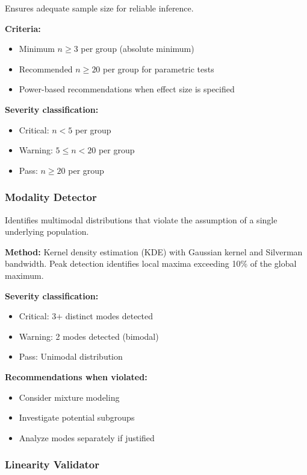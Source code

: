 \documentclass[article]{jss}
\begin{document}
Ensures adequate sample size for reliable inference.

\textbf{Criteria:}
\begin{itemize}
\item Minimum $n \geq 3$ per group (absolute minimum)
\item Recommended $n \geq 20$ per group for parametric tests
\item Power-based recommendations when effect size is specified
\end{itemize}

\textbf{Severity classification:}
\begin{itemize}
\item Critical: $n < 5$ per group
\item Warning: $5 \leq n < 20$ per group
\item Pass: $n \geq 20$ per group
\end{itemize}

\subsubsection{Modality Detector}

Identifies multimodal distributions that violate the assumption of a single underlying population.

\textbf{Method:} Kernel density estimation (KDE) with Gaussian kernel and Silverman bandwidth. Peak detection identifies local maxima exceeding 10\% of the global maximum.

\textbf{Severity classification:}
\begin{itemize}
\item Critical: 3+ distinct modes detected
\item Warning: 2 modes detected (bimodal)
\item Pass: Unimodal distribution
\end{itemize}

\textbf{Recommendations when violated:}
\begin{itemize}
\item Consider mixture modeling
\item Investigate potential subgroups
\item Analyze modes separately if justified
\end{itemize}

\subsubsection{Linearity Validator}
\end{document}
